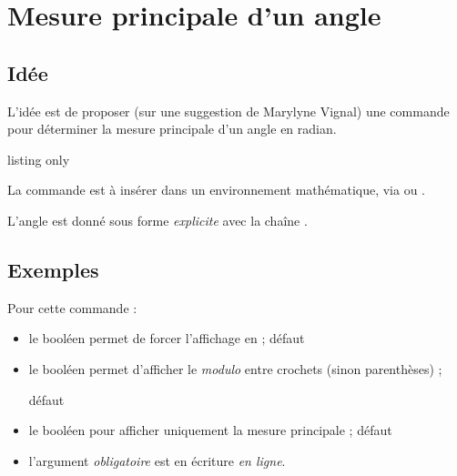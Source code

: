\newpage

\section{Mesure principale d'un angle}\label{mesureprincipale}

\subsection{Idée}

\begin{tipblock}
 L'idée est de proposer (sur une suggestion de Marylyne Vignal) une commande pour déterminer la mesure principale d'un angle en radian.
\end{tipblock}

\begin{PresCodeTexPL}{listing only}
\end{PresCodeTexPL}

\begin{noteblock}
La commande est à insérer dans un environnement mathématique, via  ou \ctex{\textbackslash[...\textbackslash]}.

L'angle est donné sous forme \textit{explicite} avec la chaîne .
\end{noteblock}

\subsection{Exemples}

\begin{cautionblock}
Pour cette commande :

\begin{itemize}
	\item le booléen  permet de forcer l'affichage en  ; \hfill{}défaut 
	\item le booléen  permet d'afficher le \textit{modulo} entre crochets (sinon parenthèses) ;
	
	\hfill{}défaut 
	\item {} le booléen  pour afficher uniquement la mesure principale ; \hfill{}défaut 
	\item l'argument \textit{obligatoire} est en écriture \textit{en ligne}.
\end{itemize}
\vspace*{-\baselineskip}\leavevmode
\end{cautionblock}

